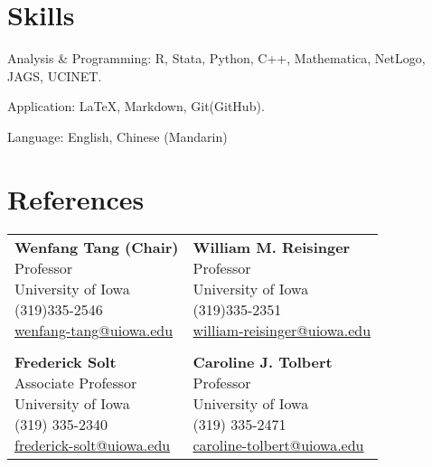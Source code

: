 \documentclass[10.5pt,]{article}
\providecommand{\tightlist}{%
	\setlength{\itemsep}{0pt}\setlength{\parskip}{0pt}}
\renewenvironment{itemize}{
	\begin{list}{}{
			\setlength{\leftmargin}{1.5em}
		}
	}{
	\end{list}
}
\begin{document}
\section{Skills}\label{skills}

\begin{itemize}
\tightlist
\item
  Analysis \& Programming: R, Stata, Python, C++, Mathematica, NetLogo,
  JAGS, UCINET.
\item
  Application: \LaTeX, Markdown, Git(GitHub).
\item
  Language: English, Chinese (Mandarin)
\end{itemize}

\section{References}\label{references}

\begin{tabular}{ll}
\parbox{5cm}{\textbf{Wenfang Tang (Chair)}\\Professor\\University of Iowa\\(319)335-2546\\\href{mailto:wenfang-tang@uiowa.edu}{wenfang-tang@uiowa.edu}}
 &\parbox{5cm}{\textbf{William M. Reisinger}\\Professor\\University of Iowa\\(319)335-2351\\\href{mailto:william-reisinger@uiowa.edu}{william-reisinger@uiowa.edu}}\\
&\\
\parbox{5cm}{\textbf{Frederick Solt}\\Associate Professor\\University of Iowa\\(319) 335-2340\\\href{mailto:frederick-solt@uiowa.edu}{frederick-solt@uiowa.edu}}
 &\parbox{5cm}{\textbf{Caroline J. Tolbert}\\Professor\\University of Iowa\\(319) 335-2471\\\href{caroline-tolbert@uiowa.edu}{caroline-tolbert@uiowa.edu}}\\
\end{tabular}
	
			
\end{document}
